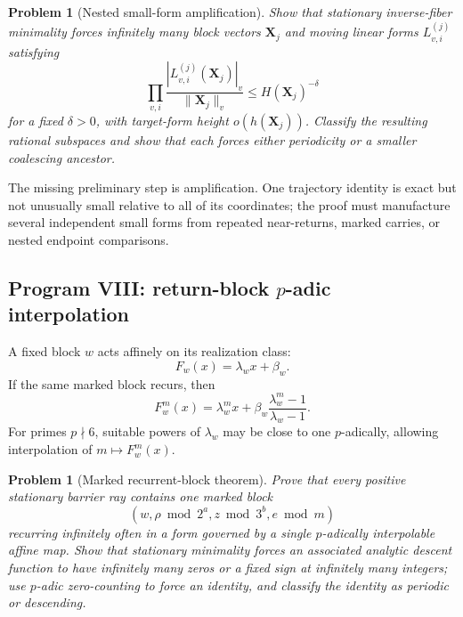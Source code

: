 \documentclass[11pt,reqno]{amsart}
\numberwithin{equation}{section}
\newtheorem{problem}[theorem]{Problem}
\theoremstyle{definition}
\theoremstyle{remark}
\newcommand{\abs}[1]{\left|#1\right|}
\begin{document}
\begin{problem}[Nested small-form amplification]\label{prob:subspace-amplification}
Show that stationary inverse-fiber minimality forces infinitely many block
vectors $\mathbf X_j$ and moving linear forms $L_{v,i}^{(j)}$ satisfying
\begin{equation}\label{eq:subspace-inequality}
\prod_{v,i}
\frac{\abs{L_{v,i}^{(j)}(\mathbf X_j)}_v}
{\|\mathbf X_j\|_v}
\le H(\mathbf X_j)^{-\delta}
\end{equation}
for a fixed $\delta>0$, with target-form height
$o(h(\mathbf X_j))$.  Classify the resulting rational subspaces and show
that each forces either periodicity or a smaller coalescing ancestor.
\end{problem}

The missing preliminary step is amplification.  One trajectory identity is
exact but not unusually small relative to all of its coordinates; the proof
must manufacture several independent small forms from repeated near-returns,
marked carries, or nested endpoint comparisons.

\subsection{Program VIII: return-block $p$-adic interpolation}

A fixed block $w$ acts affinely on its realization class:
\begin{equation}\label{eq:block-affine-map}
F_w(x)=\lambda_wx+\beta_w.
\end{equation}
If the same marked block recurs, then
\begin{equation}\label{eq:block-iterate}
F_w^m(x)
=
\lambda_w^m x
+
\beta_w\frac{\lambda_w^m-1}{\lambda_w-1}.
\end{equation}
For primes $p\nmid6$, suitable powers of $\lambda_w$ may be close to one
$p$-adically, allowing interpolation of $m\mapsto F_w^m(x)$.

\begin{problem}[Marked recurrent-block theorem]\label{prob:padic-recurrence}
Prove that every positive stationary barrier ray contains one marked block
\[
(w,\rho\bmod2^a,z\bmod3^b,e\bmod m)
\]
recurring infinitely often in a form governed by a single $p$-adically
interpolable affine map.  Show that stationary minimality forces an
associated analytic descent function to have infinitely many zeros or a
fixed sign at infinitely many integers; use $p$-adic zero-counting to force
an identity, and classify the identity as periodic or descending.
\end{problem}
\end{document}
